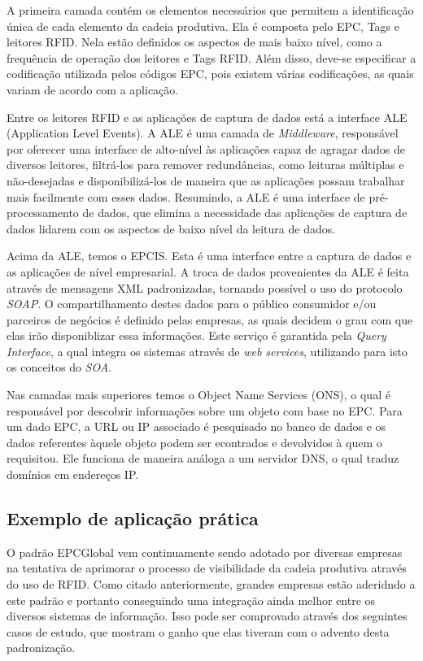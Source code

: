 \documentclass[a4paper,12pt,titlepage]{article}
\begin{document}
	A primeira camada contém os elementos necessários que permitem a identificação única de cada elemento da cadeia produtiva. Ela é composta pelo EPC, Tags e leitores RFID. Nela estão definidos os aspectos de mais baixo nível, como a frequência de operação dos leitores e Tags RFID. Além disso, deve-se especificar a codificação utilizada pelos códigos EPC, pois existem várias codificações, as quais variam de acordo com a aplicação.
	
	Entre os leitores RFID e as aplicações de captura de dados está a interface ALE (Application Level Events). A ALE é uma camada de \textit{Middleware}, responsável por oferecer uma interface de alto-nível às aplicações capaz de agragar dados de diversos leitores, filtrá-los para remover redundâncias, como leituras múltiplas e não-desejadas e disponibilizá-los de maneira que as aplicações possam trabalhar mais facilmente com esses dados. Resumindo, a ALE é uma interface de pré-processamento de dados, que elimina a necessidade das aplicações de captura de dados lidarem com os aspectos de baixo nível da leitura de dados.
	
	Acima da ALE, temos o EPCIS. Esta é uma interface entre a captura de dados e as aplicações de nível empresarial. A troca de dados provenientes da ALE é feita através de mensagens XML padronizadas, tornando possível o uso do protocolo \textit{SOAP}. O compartilhamento destes dados para o público consumidor e/ou parceiros de negócios é definido pelas empresas, as quais decidem o grau com que elas irão disponiblizar essa informações. Este serviço é garantida pela \textit{Query Interface}, a qual integra os sistemas através de \textit{web services}, utilizando para isto os conceitos do \textit{SOA}. 
	
	Nas camadas mais superiores temos o Object Name Services (ONS), o qual é responsável por descobrir informações sobre um objeto com base no EPC. Para um dado EPC, a URL ou IP associado é pesquisado no banco de dados e os dados referentes àquele objeto podem ser econtrados e devolvidos à quem o requisitou. Ele funciona de maneira análoga a um servidor DNS, o qual traduz domínios em endereços IP.
	
	\subsection{Exemplo de aplicação prática}
	O padrão EPCGlobal vem continuamente sendo adotado por diversas empresas na tentativa de aprimorar o processo de visibilidade da cadeia produtiva através do uso de RFID. Como citado anteriormente, grandes empresas estão aderidndo a este padrão e portanto conseguindo uma integração ainda melhor entre os diversos sistemas de informação. Isso pode ser comprovado através dos seguintes casos de estudo, que mostram o ganho que elas tiveram com o advento desta padronização. 
	
\end{document}
